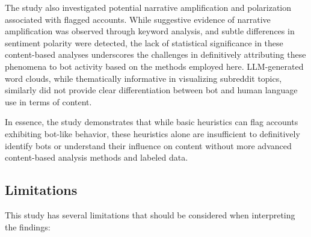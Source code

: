 \documentclass[
  12pt,
  letterpaper,
  DIV=11,
  numbers=noendperiod,
  abstract]{scrartcl}
\begin{document}
The study also investigated potential narrative amplification and
polarization associated with flagged accounts. While suggestive evidence
of narrative amplification was observed through keyword analysis, and
subtle differences in sentiment polarity were detected, the lack of
statistical significance in these content-based analyses underscores the
challenges in definitively attributing these phenomena to bot activity
based on the methods employed here. LLM-generated word clouds, while
thematically informative in visualizing subreddit topics, similarly did
not provide clear differentiation between bot and human language use in
terms of content.

In essence, the study demonstrates that while basic heuristics can flag
accounts exhibiting bot-like behavior, these heuristics alone are
insufficient to definitively identify bots or understand their influence
on content without more advanced content-based analysis methods and
labeled data.

\subsection{Limitations}\label{limitations}

This study has several limitations that should be considered when
interpreting the findings:
\end{document}
